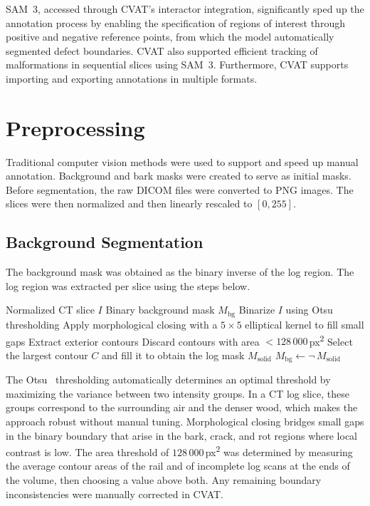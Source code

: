 SAM~3, accessed through CVAT's interactor integration, significantly sped up the annotation process by enabling the specification of regions of interest through positive and negative reference points, from which the model automatically segmented defect boundaries. CVAT also supported efficient tracking of malformations in sequential slices using SAM~3. Furthermore, CVAT supports importing and exporting annotations in multiple formats.


\section{Preprocessing}

Traditional computer vision methods were used to support and speed up manual annotation.
Background and bark masks were created to serve as initial masks.
Before segmentation, the raw DICOM files were converted to PNG images. The slices were then normalized and then linearly rescaled to $[0, 255]$.


\subsection{Background Segmentation}

The background mask was obtained as the binary inverse of the log region.
The log region was extracted per slice using the steps below.

\begin{algorithm}[H]
\caption{Log mask and background extraction per CT slice}
\label{alg:logmask}
\begin{algorithmic}[1]
\Require Normalized CT slice $I$
\Ensure Binary background mask $M_\text{bg}$
\State Binarize $I$ using Otsu thresholding
\State Apply morphological closing with a $5 \times 5$ elliptical kernel to fill small gaps
\State Extract exterior contours 
\State Discard contours with area $< 128\,000$\,px\textsuperscript{2}
\State Select the largest contour $C$ and fill it to obtain the log mask $M_\text{solid}$
\State $M_\text{bg} \gets \neg\,M_\text{solid}$
\end{algorithmic}
\end{algorithm}

The Otsu~\cite{otsu1979threshold} thresholding automatically determines an optimal threshold by maximizing the
variance between two intensity groups.
In a CT log slice, these groups correspond to the surrounding air and the denser
wood, which makes the approach robust without manual tuning.
Morphological closing bridges small gaps in the binary boundary that arise in the bark, crack, and rot regions where local contrast is low. The area threshold of $128\,000$\,px\textsuperscript{2} was determined by measuring the average contour areas of the rail and of incomplete log scans at the ends of the volume, then choosing a value above both. Any remaining boundary inconsistencies were manually corrected in CVAT.


